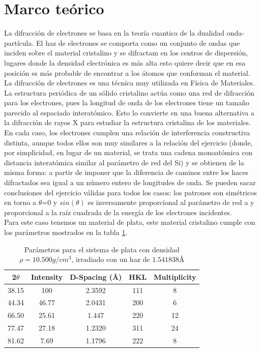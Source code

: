 \documentclass[reprint,amsmath,amssymb,aps,]{revtex4-2}
\begin{document}
\section{Marco teórico}
La difracción de electrones se basa en la teoría cuantica de la dualidad onda-partícula. El haz de electrones se comporta como un conjunto
de ondas que inciden sobre el material cristalino y se difractam en los centros de dispersión, lugares donde la densidad electrónica es más alta
esto quiere decir que en esa posición es más probable de encontrar a los átomos que conforman el material.\\ 
La difracción de electrones es una técnica muy utilizada en Física de Materiales. La estructura periódica
de un sólido cristalino actúa como una red de difracción para los electrones, pues la longitud de onda de
los electrones tiene un tamaño parecido al espaciado interatómico. Esto lo convierte en una buena
alternativa a la difracción de rayos X para
estudiar la estructura cristalina de los
materiales. En cada caso, los electrones cumplen una relación de interferencia constructiva distinta, aunque todos
ellos son muy similares a la relación del ejercicio (donde, por simplicidad, en lugar de un material, se
trata una cadena monoatómica con distancia interatómica similar al parámetro de red del Si) y se
obtienen de la misma forma: a partir de imponer que la diferencia de caminos entre los haces
difractados sea igual a un número entero de longitudes de onda. Se pueden sacar conclusiones del
ejercicio válidas para todos los casos: los patrones son simétricos en torno a $\theta$=0 y $sin(\theta)$ es
inversamente proporcional al parámetro de red a y proporcional a la raíz cuadrada de la energía de los
electrones incidentes.\\
Para este caso tenemos un material de plata, este material cristalino cumple con los parámetros 
mostrados en la tabla \ref{tabla:parametros}.
\begin{table}[H]
    \centering
    \begin{tabular}{ccccc}\hline
        2$\theta$ & Intensity & D-Spacing (\r{A}) & HKL & Multiplicity\\ \hline
        38.15 & 100 & 2.3592 & 111 & 8 \\
        44.34 & 46.77 & 2.0431 & 200 & 6 \\
        66.50 & 25.61 & 1.447 & 220 & 12 \\
        77.47 & 27.18 & 1.2320 & 311 & 24 \\
        81.62 & 7.69 & 1.1796 & 222 & 8 \\ \hline
    \end{tabular}
    \caption{Parámetros para el sistema de plata con densidad $\rho=10.500 g/cm^{3}$, irradiado con un haz de $1.541838$\r{A}}
    \label{tabla:parametros}
\end{table}
\end{document}
